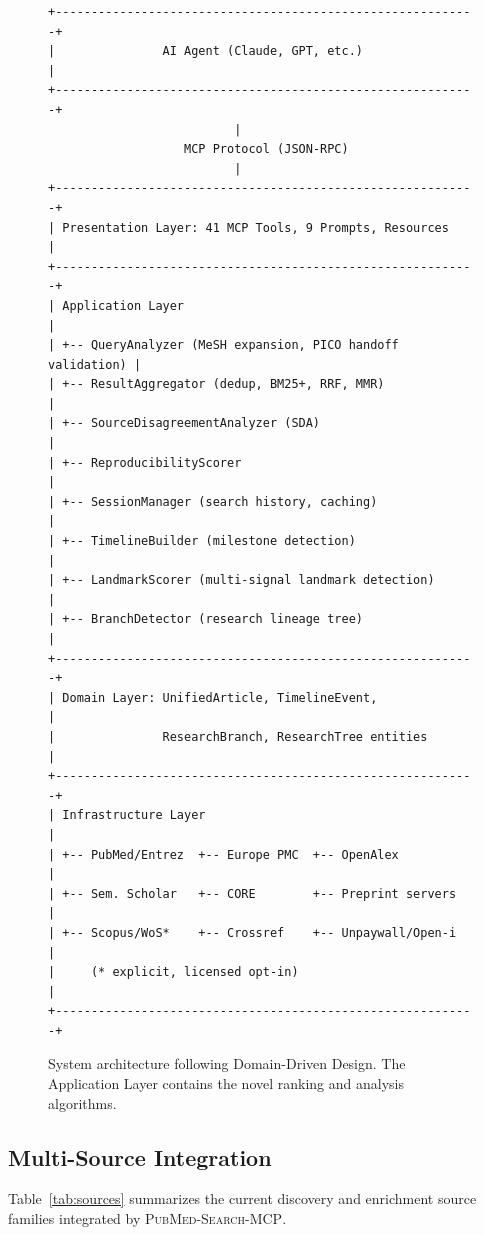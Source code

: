 \documentclass[11pt,a4paper]{article}
\newcommand{\system}{\textsc{PubMed-Search-MCP}}
\begin{document}
\begin{figure}[htbp]
\centering
\small
\begin{verbatim}
+-----------------------------------------------------------+
|               AI Agent (Claude, GPT, etc.)                |
+-----------------------------------------------------------+
                          |
                   MCP Protocol (JSON-RPC)
                          |
+-----------------------------------------------------------+
| Presentation Layer: 41 MCP Tools, 9 Prompts, Resources    |
+-----------------------------------------------------------+
| Application Layer                                         |
| +-- QueryAnalyzer (MeSH expansion, PICO handoff validation) |
| +-- ResultAggregator (dedup, BM25+, RRF, MMR)            |
| +-- SourceDisagreementAnalyzer (SDA)                      |
| +-- ReproducibilityScorer                                 |
| +-- SessionManager (search history, caching)              |
| +-- TimelineBuilder (milestone detection)                 |
| +-- LandmarkScorer (multi-signal landmark detection)      |
| +-- BranchDetector (research lineage tree)                |
+-----------------------------------------------------------+
| Domain Layer: UnifiedArticle, TimelineEvent,              |
|               ResearchBranch, ResearchTree entities        |
+-----------------------------------------------------------+
| Infrastructure Layer                                      |
| +-- PubMed/Entrez  +-- Europe PMC  +-- OpenAlex           |
| +-- Sem. Scholar   +-- CORE        +-- Preprint servers   |
| +-- Scopus/WoS*    +-- Crossref    +-- Unpaywall/Open-i   |
|     (* explicit, licensed opt-in)                         |
+-----------------------------------------------------------+
\end{verbatim}
\caption{System architecture following Domain-Driven Design. The Application Layer contains the novel ranking and analysis algorithms.}
\label{fig:architecture}
\end{figure}

\subsection{Multi-Source Integration}

Table~\ref{tab:sources} summarizes the current discovery and enrichment source families integrated by \system{}.
\end{document}
